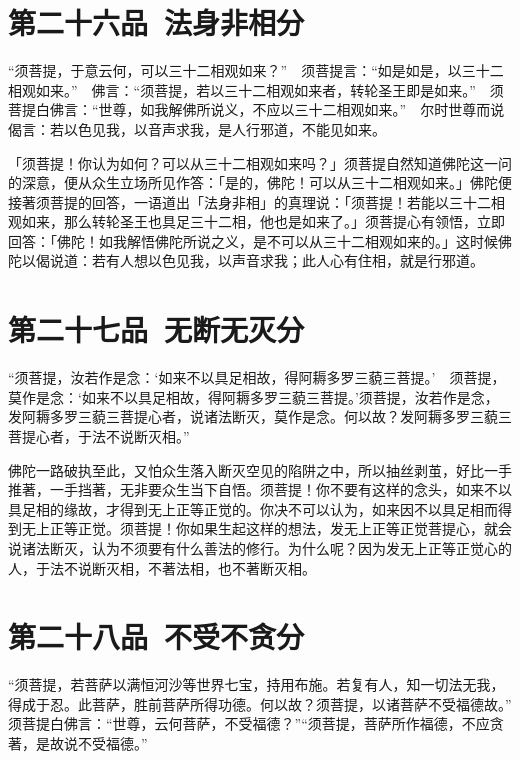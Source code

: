 \documentclass[12pt,twoside,openany]{book}
\newcommand{\kai}[1]{{\CJKfamily{kai}#1}}
\begin{document}
\chapter{第二十六品\ 法身非相分}
\begin{pinyinscope}
“须菩提，于意云何，可以三十二相观如来？”　须菩提言：“如是如是，以三十二相观如来。”　佛言：“须菩提，若以三十二相观如来者，转轮圣王即是如来。”　须菩提白佛言：“世尊，如我解佛所说义，不应以三十二相观如来。”　尔时世尊而说偈言：若以色见我，以音声求我，是人行邪道，不能见如来。
\end{pinyinscope}

\kai{「须菩提！你认为如何？可以从三十二相观如来吗？」须菩提自然知道佛陀这一问的深意，便从众生立场所见作答：「是的，佛陀！可以从三十二相观如来。」佛陀便接著须菩提的回答，一语道出「法身非相」的真理说：「须菩提！若能以三十二相观如来，那么转轮圣王也具足三十二相，他也是如来了。」须菩提心有领悟，立即回答：「佛陀！如我解悟佛陀所说之义，是不可以从三十二相观如来的。」这时候佛陀以偈说道：若有人想以色见我，以声音求我；此人心有住相，就是行邪道。}

\chapter{第二十七品\ 无断无灭分}
\begin{pinyinscope}
“须菩提，汝若作是念：‘如来不以具足相故，得阿耨多罗三藐三菩提。’　须菩提，莫作是念：‘如来不以具足相故，得阿耨多罗三藐三菩提。’须菩提，汝若作是念，发阿耨多罗三藐三菩提心者，说诸法断灭，莫作是念。何以故？发阿耨多罗三藐三菩提心者，于法不说断灭相。”
\end{pinyinscope}

\kai{佛陀一路破执至此，又怕众生落入断灭空见的陷阱之中，所以抽丝剥茧，好比一手推著，一手挡著，无非要众生当下自悟。须菩提！你不要有这样的念头，如来不以具足相的缘故，才得到无上正等正觉的。你决不可以认为，如来因不以具足相而得到无上正等正觉。须菩提！你如果生起这样的想法，发无上正等正觉菩提心，就会说诸法断灭，认为不须要有什么善法的修行。为什么呢？因为发无上正等正觉心的人，于法不说断灭相，不著法相，也不著断灭相。}

\chapter{第二十八品\ 不受不贪分}
\begin{pinyinscope}
“须菩提，若菩萨以满恒河沙等世界七宝，持用布施。若复有人，知一切法无我，得成于忍。此菩萨，胜前菩萨所得功德。何以故？须菩提，以诸菩萨不受福德故。”　须菩提白佛言：“世尊，云何菩萨，不受福德？”“须菩提，菩萨所作福德，不应贪著，是故说不受福德。”
\end{pinyinscope}
\end{document}
